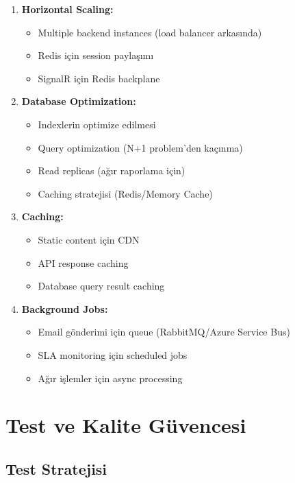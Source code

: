 \documentclass[12pt,a4paper]{article}
\begin{document}
\begin{enumerate}
    \item \textbf{Horizontal Scaling:}
    \begin{itemize}
        \item Multiple backend instances (load balancer arkasında)
        \item Redis için session paylaşımı
        \item SignalR için Redis backplane
    \end{itemize}
    
    \item \textbf{Database Optimization:}
    \begin{itemize}
        \item Indexlerin optimize edilmesi
        \item Query optimization (N+1 problem'den kaçınma)
        \item Read replicas (ağır raporlama için)
        \item Caching stratejisi (Redis/Memory Cache)
    \end{itemize}
    
    \item \textbf{Caching:}
    \begin{itemize}
        \item Static content için CDN
        \item API response caching
        \item Database query result caching
    \end{itemize}
    
    \item \textbf{Background Jobs:}
    \begin{itemize}
        \item Email gönderimi için queue (RabbitMQ/Azure Service Bus)
        \item SLA monitoring için scheduled jobs
        \item Ağır işlemler için async processing
    \end{itemize}
\end{enumerate}

\newpage

\section{Test ve Kalite Güvencesi}

\subsection{Test Stratejisi}
\end{document}
